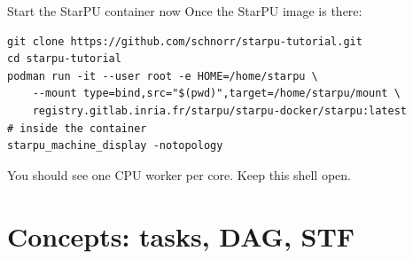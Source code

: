 \documentclass[presentation, aspectratio=169]{beamer}
\begin{document}
\begin{frame}[label={sec:org6202022},fragile]{Start the StarPU container now}
 Once the StarPU image is there:

\footnotesize
\begin{verbatim}
git clone https://github.com/schnorr/starpu-tutorial.git
cd starpu-tutorial
podman run -it --user root -e HOME=/home/starpu \
    --mount type=bind,src="$(pwd)",target=/home/starpu/mount \
    registry.gitlab.inria.fr/starpu/starpu-docker/starpu:latest
# inside the container
starpu_machine_display -notopology
\end{verbatim}
\normalsize

You should see one CPU worker per core. Keep this shell open.
\end{frame}
\section{Concepts: tasks, DAG, STF}
\label{sec:org670ba45}
\end{document}
